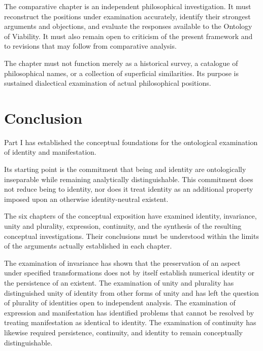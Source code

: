 The comparative chapter is an independent philosophical
investigation. It must reconstruct the positions under
examination accurately, identify their strongest
arguments and objections, and evaluate the responses
available to the Ontology of Viability. It must also
remain open to criticism of the present framework
and to revisions that may follow from comparative
analysis.

The chapter must not function merely as a historical
survey, a catalogue of philosophical names, or a
collection of superficial similarities. Its purpose
is sustained dialectical examination of actual
philosophical positions.






\section*{Conclusion}

Part I has established the conceptual foundations for
the ontological examination of identity and manifestation.

Its starting point is the commitment that being and
identity are ontologically inseparable while remaining
analytically distinguishable. This commitment does
not reduce being to identity, nor does it treat identity
as an additional property imposed upon an otherwise
identity-neutral existent.

The six chapters of the conceptual exposition have
examined identity, invariance, unity and plurality,
expression, continuity, and the synthesis of the
resulting conceptual investigations. Their conclusions
must be understood within the limits of the arguments
actually established in each chapter.

The examination of invariance has shown that the
preservation of an aspect under specified transformations
does not by itself establish numerical identity or
the persistence of an existent. The examination of
unity and plurality has distinguished unity of identity
from other forms of unity and has left the question
of plurality of identities open to independent analysis.
The examination of expression and manifestation has
identified problems that cannot be resolved by treating
manifestation as identical to identity. The examination
of continuity has likewise required persistence,
continuity, and identity to remain conceptually
distinguishable.

